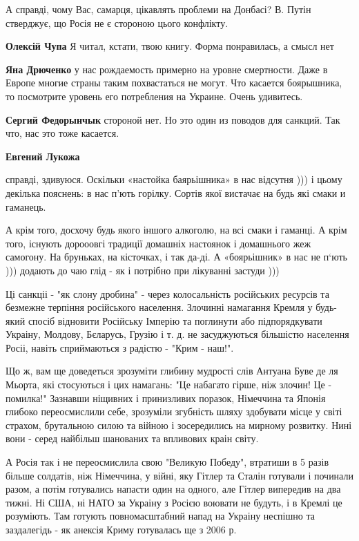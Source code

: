 \begin{itemize}
\begin{itemize}
А справді, чому Вас, самарця, цікавлять проблеми на Донбасі? В. Путін стверджує,
що Росія не є стороною цього конфлікту.

\textbf{Олексій Чупа} Я читал, кстати, твою книгу. Форма понравилась, а смысл нет

\textbf{Яна Дрюченко} у нас рождаемость примерно на уровне смертности. Даже в Европе многие страны таким похвастаться не могут.
Что касается боярышника, то посмотрите уровень его потребления на Украине. Очень удивитесь.

\textbf{Сергий Федорынчык} стороной нет. Но это один из поводов для санкций. Так что, нас это тоже касается.

\textbf{Евгений Лукожа} 

справді, здивуюся. Оскільки «настойка баярьішника» в нас відсутня ))) і цьому
декілька пояснень: в нас п’ють горілку. Сортів якої вистачає на будь які смаки
и гаманець.

А крім того, досхочу будь якого іншого алкоголю, на всі смаки і гаманці. А крім
того, існують дорооовгі традиції домашніх настоянок і домашнього жеж самогону.
На бруньках, на кісточках, і так да-ді. А «боярьішник» в нас не п‘ють )))
додають до чаю глід - як і потрібно при лікуванні застуди )))


Ці санкціі - "як слону дробина" - через колосальність російських ресурсів та
безмежне терпіння російського населення. Злочинні намагання Кремля у будь-який
спосіб відновити Російську Імперію та поглинути або підпорядкувати Украіну,
Молдову, Бєларусь, Грузію і т. д. не засуджуються більшістю населення Росіі,
навіть сприймаються з радістю - "Крим - наш!". 

Що ж, вам ще доведеться
зрозуміти глибину мудрості слів Антуана Буве де ля Мьорта, які стосуються і цих
намагань: "Це набагато гірше, ніж злочин! Це - помилка!" Зазнавши ніщивних і
принизливих поразок, Німеччина та Японія глибоко переосмислили себе, зрозуміли
згубність шляху здобувати місце у світі страхом, брутальною силою та війною і
зосередились на мирному розвитку. Нині вони - серед найбільш шанованих та
впливових краін світу. 

А Росія так і не переосмислила свою "Великую Победу",
втратиши в 5 разів більше солдатів, ніж Німеччина, у війні, яку Гітлер та
Сталін готували і починали разом, а потім готувались напасти один на одного,
але Гітлер випередив на два тижні. Ні США, ні НАТО за Украіну з Росією воювати
не будуть, і в Кремлі це розуміють. Там готують повномасштабний напад на
Украіну неспішно та заздалегідь - як анексія Криму готувалась ще з 2006 р. 


\end{itemize}
\end{itemize}
